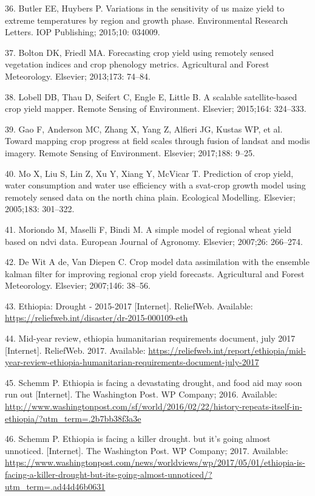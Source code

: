 \documentclass[]{elsarticle} %
\begin{document}
\hypertarget{ref-butler2015variations}{}
36. Butler EE, Huybers P. Variations in the sensitivity of us maize
yield to extreme temperatures by region and growth phase. Environmental
Research Letters. IOP Publishing; 2015;10: 034009.

\hypertarget{ref-bolton2013forecasting}{}
37. Bolton DK, Friedl MA. Forecasting crop yield using remotely sensed
vegetation indices and crop phenology metrics. Agricultural and Forest
Meteorology. Elsevier; 2013;173: 74--84.

\hypertarget{ref-lobell2015scalable}{}
38. Lobell DB, Thau D, Seifert C, Engle E, Little B. A scalable
satellite-based crop yield mapper. Remote Sensing of Environment.
Elsevier; 2015;164: 324--333.

\hypertarget{ref-gao2017toward}{}
39. Gao F, Anderson MC, Zhang X, Yang Z, Alfieri JG, Kustas WP, et al.
Toward mapping crop progress at field scales through fusion of landsat
and modis imagery. Remote Sensing of Environment. Elsevier; 2017;188:
9--25.

\hypertarget{ref-mo2005prediction}{}
40. Mo X, Liu S, Lin Z, Xu Y, Xiang Y, McVicar T. Prediction of crop
yield, water consumption and water use efficiency with a svat-crop
growth model using remotely sensed data on the north china plain.
Ecological Modelling. Elsevier; 2005;183: 301--322.

\hypertarget{ref-moriondo2007simple}{}
41. Moriondo M, Maselli F, Bindi M. A simple model of regional wheat
yield based on ndvi data. European Journal of Agronomy. Elsevier;
2007;26: 266--274.

\hypertarget{ref-de2007crop}{}
42. De Wit A de, Van Diepen C. Crop model data assimilation with the
ensemble kalman filter for improving regional crop yield forecasts.
Agricultural and Forest Meteorology. Elsevier; 2007;146: 38--56.

\hypertarget{ref-reliefweb2017}{}
43. Ethiopia: Drought - 2015-2017 {[}Internet{]}. ReliefWeb. Available:
\url{https://reliefweb.int/disaster/dr-2015-000109-eth}

\hypertarget{ref-reliefweb_2017b}{}
44. Mid-year review, ethiopia humanitarian requirements document, july
2017 {[}Internet{]}. ReliefWeb. 2017. Available:
\url{https://reliefweb.int/report/ethiopia/mid-year-review-ethiopia-humanitarian-requirements-document-july-2017}

\hypertarget{ref-schemm_2016}{}
45. Schemm P. Ethiopia is facing a devastating drought, and food aid may
soon run out {[}Internet{]}. The Washington Post. WP Company; 2016.
Available:
\url{http://www.washingtonpost.com/sf/world/2016/02/22/history-repeats-itself-in-ethiopia/?utm_term=.2b7bb38f3a3e}

\hypertarget{ref-schemm_2017}{}
46. Schemm P. Ethiopia is facing a killer drought. but it's going almost
unnoticed. {[}Internet{]}. The Washington Post. WP Company; 2017.
Available:
\url{https://www.washingtonpost.com/news/worldviews/wp/2017/05/01/ethiopia-is-facing-a-killer-drought-but-its-going-almost-unnoticed/?utm_term=.ad44d46b0631}
\end{document}
